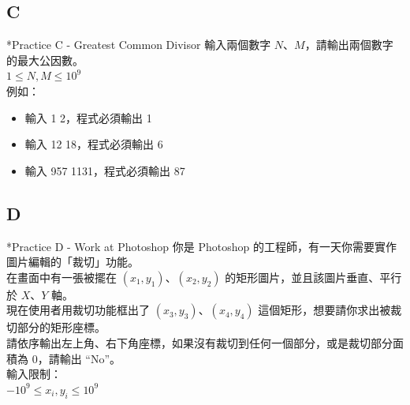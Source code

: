 \documentclass[t]{beamer}
\begin{document}
\subsection{C}
\begin{frame}{*Practice C - Greatest Common Divisor}
  輸入兩個數字 $N$、$M$，請輸出兩個數字的最大公因數。\\
  \vspace{1em}
  $1\le N, M\le 10^{9}$\\
  \vspace{1em}
  例如：
  \begin{itemize}
    \item 輸入 1 2，程式必須輸出 1
    \item 輸入 12 18，程式必須輸出 6
    \item 輸入 957 1131，程式必須輸出 87
  \end{itemize}
\end{frame}

\subsection{D}
\begin{frame}{*Practice D - Work at Photoshop}
  你是 Photoshop 的工程師，有一天你需要實作圖片編輯的「裁切」功能。\\
  在畫面中有一張被擺在 $(x_{1},y_{1})$、$(x_{2},y_{2})$ 的矩形圖片，並且該圖片垂直、平行於 $X$、$Y$ 軸。\\
  現在使用者用裁切功能框出了 $(x_{3},y_{3})$、$(x_{4},y_{4})$ 這個矩形，想要請你求出被裁切部分的矩形座標。\\
  請依序輸出左上角、右下角座標，如果沒有裁切到任何一個部分，或是裁切部分面積為 $0$，請輸出 ``No''。\\
  \vspace{1em}
  輸入限制：\\
  $-10^{9}\le x_{i}, y_{i} \le 10^{9}$
\end{frame}
\end{document}

